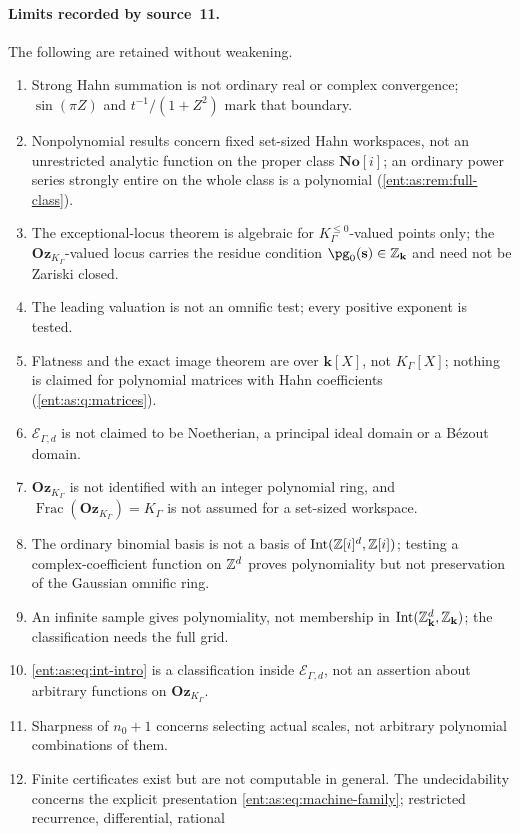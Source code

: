 \documentclass[11pt]{article}
\theoremstyle{plain}
\theoremstyle{plain}
\theoremstyle{plain}
\theoremstyle{definition}
\theoremstyle{definition}
\theoremstyle{definition}
\theoremstyle{definition}
\theoremstyle{remark}
\newcommand{\No}{\mathbf{No}}
\newcommand{\K}{K_\Gamma}\newcommand{\KD}{K_\Delta}
\newcommand{\kk}{\mathbf k}\newcommand{\PP}{\mathbb P}
\newcommand{\Oz}{\mathbf{Oz}}\newcommand{\Ed}{\mathcal E_{\Gamma,d}}
\newcommand{\Kle}{K_\Gamma^{\le0}}\DeclareMathOperator{\Jac}{Jac}
\newcommand{\Zk}{\Z_{\kk}}\newcommand{\OzK}{\Oz_{\K}}
\DeclareMathOperator{\Int}{Int}\DeclareMathOperator{\ct}{ct}
\begin{document}
\paragraph{Limits recorded by source~11.} The following are retained without
weakening.
\begin{enumerate}[label=(\arabic*),leftmargin=2em]
\item Strong Hahn summation is not ordinary real or complex convergence;
$\sin(\pi Z)$ and $t^{-1}/(1+Z^2)$ mark that boundary.
\item Nonpolynomial results concern fixed set-sized Hahn workspaces, not an
unrestricted analytic function on the proper class $\No[i]$; an ordinary power
series strongly entire on the whole class is a polynomial
(\cref{ent:as:rem:full-class}).
\item The exceptional-locus theorem is algebraic for $\Kle$-valued points only;
the $\OzK$-valued locus carries the residue condition $\pg_0(\mathbf s)\in\Zk$
and need not be Zariski closed.
\item The leading valuation is not an omnific test; every positive exponent is
tested.
\item Flatness and the exact image theorem are over $\kk[X]$, not $\K[X]$;
nothing is claimed for polynomial matrices with Hahn coefficients
(\cref{ent:as:q:matrices}).
\item $\Ed$ is not claimed to be Noetherian, a principal ideal domain or a
B\'ezout domain.
\item $\OzK$ is not identified with an integer polynomial ring, and
$\operatorname{Frac}(\OzK)=\K$ is not assumed for a set-sized workspace.
\item The ordinary binomial basis is not a basis of $\Int(\Z[i]^d,\Z[i])$;
testing a complex-coefficient function on $\mathbb Z^d$ proves polynomiality but not
preservation of the Gaussian omnific ring.
\item An infinite sample gives polynomiality, not membership in
$\Int(\Zk^d,\Zk)$; the classification needs the full grid.
\item \eqref{ent:as:eq:int-intro} is a classification inside $\Ed$, not an
assertion about arbitrary functions on $\OzK$.
\item Sharpness of $n_0+1$ concerns selecting actual scales, not arbitrary
polynomial combinations of them.
\item Finite certificates exist but are not computable in general. The
undecidability concerns the explicit presentation
\eqref{ent:as:eq:machine-family}; restricted recurrence, differential, rational

\end{enumerate}
\end{document}
